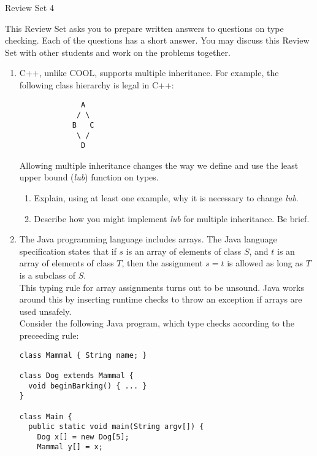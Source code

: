 \documentclass[12pt]{article}
\begin{document}
\begin{center}
{\large Review Set 4} 
\end{center}

This Review Set asks you to prepare written answers to questions on
type checking. Each of the questions has a short answer. You may
discuss this Review Set with other students and work on the problems
together. 

\begin{enumerate}

\item{{C++}, unlike COOL, supports multiple inheritance. For example,
  the following class hierarchy is legal in C++:

\begin{lstlisting}
              A
             / \
            B   C
             \ /
              D
\end{lstlisting}

Allowing multiple inheritance changes the way we define and use the
least upper bound (\emph{lub}) function on types.
\begin{enumerate}
\item{Explain, using at least one example, why it is necessary to
  change \emph{lub}.}
\item{Describe how you might implement \emph{lub} for multiple
  inheritance. Be brief.}
\end{enumerate}
}
\item{ The Java programming language includes arrays.  The Java
language specification states that if $s$ is an array of elements of
class $S$, and $t$ is an array of elements of class $T$, then the
assignment $s = t$ is allowed as long as $T$ is a subclass of $S$.
\\

This typing rule for array assignments turns out to be unsound. Java
works around this by inserting runtime checks to throw an exception if
arrays are used unsafely.
\\

Consider the following Java program, which type checks according
to the preceeding rule:

\begin{lstlisting}[caption=totally innocuous Java code]
class Mammal { String name; }

class Dog extends Mammal {
  void beginBarking() { ... }
}

class Main {
  public static void main(String argv[]) {
    Dog x[] = new Dog[5];
    Mammal y[] = x;


\end{lstlisting}}
\end{enumerate}
\end{document}
